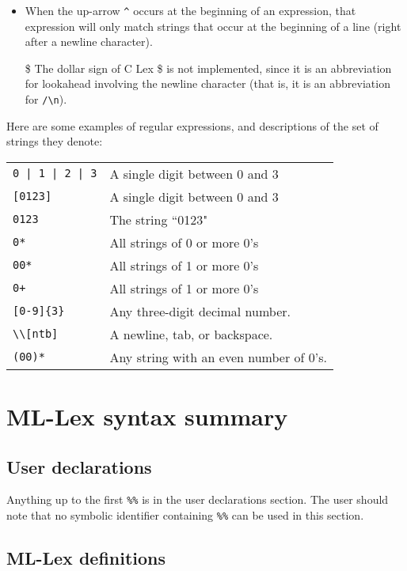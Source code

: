\begin{itemize}
\item        When the up-arrow \verb|^| occurs at the beginning of an expression,
        that expression will only match strings that occur at the
        beginning of a line (right after a newline character).

\item[\$]   The dollar sign of C Lex \$ is not implemented, since it is an abbreviation
        for lookahead involving the newline character (that is, it
        is an abbreviation for \verb|/\n|).
\end{itemize}
        
Here are some examples of regular expressions, and descriptions of the
set of strings they denote:

\begin{tabular}{ll}
\verb~0 | 1 | 2 | 3~&           A single digit between 0 and 3\\
\verb|[0123]|&                        A single digit between 0 and 3\\
\verb|0123|&                    The string ``0123"\\
\verb|0*|&                      All strings of 0 or more 0's\\
\verb|00*|&                     All strings of 1  or more 0's\\
\verb|0+|&                      All strings of 1  or more 0's\\
\verb|[0-9]{3}|&                Any three-digit decimal number.\\
\verb|\\[ntb]|&                        A newline, tab, or backspace.\\
\verb|(00)*|& Any string with an even number of 0's.
\end{tabular}

\section{ML-Lex syntax summary}

\subsection{User declarations}

Anything up to the first \verb|%%| is in the user declarations section.  The
user should note that no symbolic identifier containing 
\verb|%%| can be
used in this section.

\subsection{ML-Lex definitions}


